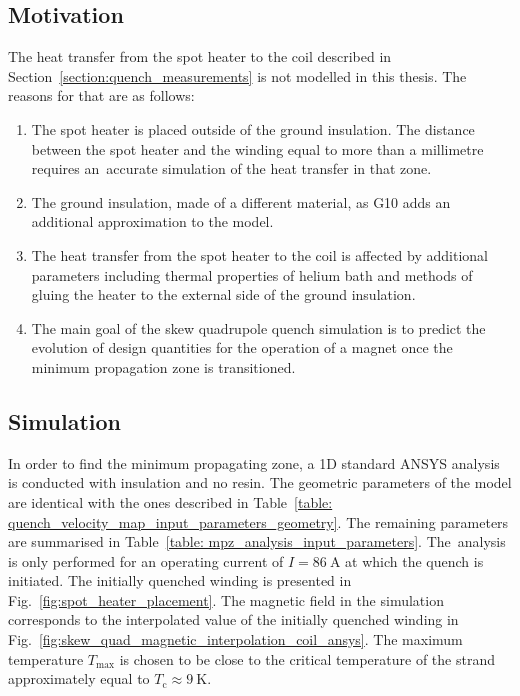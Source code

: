 
\subsection{Motivation}

The heat transfer from the spot heater to the coil described in Section~\ref{section:quench_measurements} is not modelled in this thesis. The reasons for that are as follows: 

\begin{enumerate}
    \item The spot heater is placed outside of the ground insulation. The distance between the spot heater and the winding equal to more than a millimetre requires an~accurate simulation of the heat transfer in that zone. 
    \item The ground insulation, made of a different material, as G10 adds an additional approximation to the model. 
    \item The heat transfer from the spot heater to the coil is affected by additional parameters including thermal properties of helium bath and methods of gluing the heater to the external side of the ground insulation.
    \item The main goal of the skew quadrupole quench simulation is to predict the evolution of design quantities for the operation of a magnet once the minimum propagation zone is transitioned. 
\end{enumerate}

\subsection{Simulation}

In order to find the minimum propagating zone, a 1D standard ANSYS analysis is conducted with insulation and no resin. The geometric parameters of the model are identical with the ones described in Table~\ref{table: quench_velocity_map_input_parameters_geometry}. The remaining parameters are summarised in Table~\ref{table: mpz_analysis_input_parameters}. The~analysis is only performed for an operating current of $I=86~\text{A}$ at which the quench is initiated. The initially quenched winding is presented in Fig.~\ref{fig:spot_heater_placement}. The magnetic field in the simulation corresponds to the interpolated value of the initially quenched winding in Fig.~\ref{fig:skew_quad_magnetic_interpolation_coil_ansys}. The maximum temperature $T_\text{max}$ is chosen to be close to the critical temperature of the strand approximately equal to $T_\text{c} \approx 9~\text{K}$.

